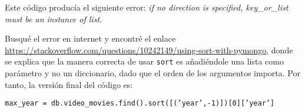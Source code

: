 \documentclass{article}
\begin{document}
Este código producía el siguiente error: \textit{if no direction is specified, key\_or\_list must be an instance of list}.

Busqué el error en internet y encontré el enlace \href{https://stackoverflow.com/questions/10242149/using-sort-with-pymongo}{https://stackoverflow.com/questions/10242149/using-sort-with-pymongo}, donde se explica que la manera correcta de usar \texttt{sort} es añadiéndole una lista como parámetro y no un diccionario, dado que el orden de los argumentos importa. Por tanto, la versión final del código es:
\vspace{-1mm}
\begin{center}
  \texttt{max\_year = db.video\_movies.find().sort([('year',-1)])[0]['year']}
\end{center}
\end{document}
